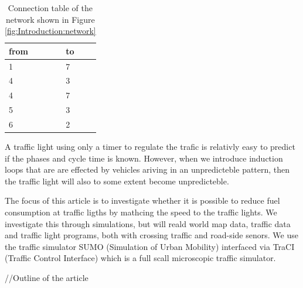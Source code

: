 \begin{table}[h]
\centering
\begin{tabular}{|l|l|}
\hline
from & to \\ \hline
1 & 7 \\ \hline
4 & 3 \\ \hline
4 & 7 \\ \hline
5 & 3 \\ \hline
6 & 2 \\ \hline
\end{tabular}
\caption{Connection table of the network shown in Figure \ref{fig:Introduction:network} }
\label{tab:Introduction:connectionTable}
\end{table}


A traffic light using only a timer to regulate the trafic is relativly easy to predict if the phases and cycle time is known. 
However, when we introduce induction loops that are are effected by vehicles ariving in an unpredicteble pattern, then the traffic light will also to some extent become unpredicteble. 

The focus of this article is to investigate whether it is possible to reduce fuel consumption at traffic ligths by mathcing the speed to the traffic lights. We investigate this through simulations, but will reald world map data, traffic data and traffic light programs, %
both with crossing traffic and road-side senors.
We use the traffic simulator SUMO (Simulation of Urban Mobility)\cite{sumo} interfaced via TraCI (Traffic Control Interface)\cite{traci} which is a full scall microscopic traffic simulator.

//Outline of the article





